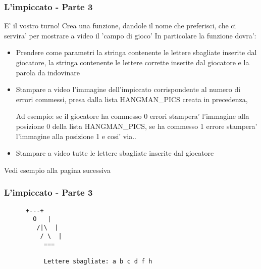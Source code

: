 \begin{frame}[fragile]
	\frametitle{L'impiccato - Parte 3}

	\begin{block}{E' il vostro turno!}
		Crea una funzione, dandole il nome che preferisci, che ci servira' per mostrare a video il 'campo di gioco'
		In particolare la funzione dovra':
		    \begin{itemize}
			    \item Prendere come parametri la stringa contenente le lettere sbagliate inserite dal giocatore, la stringa contenente le lettere corrette inserite dal giocatore e la parola da indovinare
			    \item Stampare a video l'immagine dell'impiccato corrispondente al numero di errori commessi, presa dalla lista HANGMAN\_PICS creata in precedenza, 

				    Ad esempio: se il giocatore ha commesso 0 errori stampera' l'immagine alla posizione 0 della lista HANGMAN\_PICS, se ha commesso 1 errore stampera' l'immagine alla posizione 1 e cosi' via..
			    \item Stampare a video tutte le lettere sbagliate inserite dal giocatore
		    \end{itemize}
	\end{block}

	Vedi esempio alla pagina sucessiva
\end{frame}

\begin{frame}[fragile]
	\frametitle{L'impiccato - Parte 3}

	\begin{lstlisting}
	  +---+
	    O   |
	     /|\  |
	      / \  |
		   ===

		   Lettere sbagliate: a b c d f h 
	\end{lstlisting}

\end{frame}


